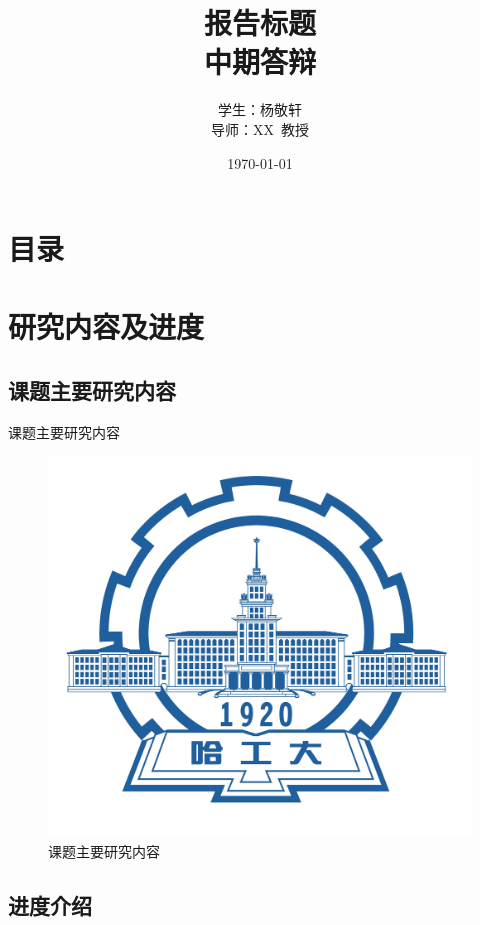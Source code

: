 \documentclass[compress]{beamer}
\begin{document}
\graphicspath{{figures/}}

\title[报告标题]{报告标题\\[2mm] 中期答辩}
\author[杨敬轩]{学生：杨敬轩\\[5mm] 导师：XX\ 教授}
\date{\small \vskip -10pt \today}

\begin{frame}
		\maketitle
\end{frame}

\section*{目录}
\frame{
  \frametitle{\secname}
  \tableofcontents[hideallsubsections]
}

\section{研究内容及进度}

\subsection{课题主要研究内容}

\begin{frame}{课题主要研究内容}
  \begin{figure}
    \includegraphics[width=0.6\linewidth]{hitlogo}
    \caption{课题主要研究内容}
  \end{figure}
\end{frame}

\subsection{进度介绍}
\end{document}
